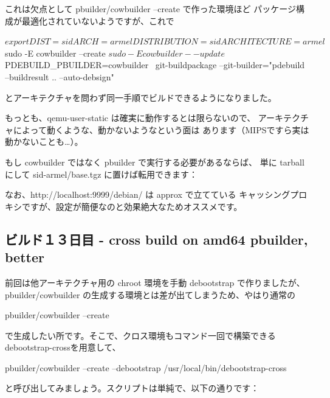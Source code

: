 \documentclass[mingoth,a4paper]{jsarticle}
\begin{document}
これは欠点として pbuilder/cowbuilder --create で作った環境ほど
パッケージ構成が最適化されていないようですが、これで

\begin{commandline}
$ export DIST=sid ARCH=armel DISTRIBUTION=sid ARCHITECTURE=armel
$ sudo -E cowbuilder --create
$ sudo -E cowbuilder --update
$ PDEBUILD_PBUILDER=cowbuilder \
git-buildpackage --git-builder="pdebuild --buildresult .. --auto-debsign"
\end{commandline}

とアーキテクチャを問わず同一手順でビルドできるようになりました。

もっとも、qemu-user-static は確実に動作するとは限らないので、
アーキテクチャによって動くような、動かないようなという面は
あります（MIPSですら実は動かないことも…）。

もし cowbuilder ではなく pbuilder で実行する必要があるならば、
単に tarball にして sid-armel/base.tgz に置けば転用できます：


なお、http://localhost:9999/debian/ は approx で立てている
キャッシングプロキシですが、設定が簡便なのと効果絶大なためオススメです。

\subsection{ビルド１３日目 - cross build on amd64 pbuilder, better}

前回は他アーキテクチャ用の chroot 環境を手動 debootstrap で作りましたが、
pbuilder/cowbuilder の生成する環境とは差が出てしまうため、やはり通常の

\begin{commandline}
pbuilder/cowbuilder --create
\end{commandline}

で生成したい所です。そこで、クロス環境もコマンド一回で構築できる
debootstrap-crossを用意して、

\begin{commandline}
pbuilder/cowbuilder --create --debootstrap /usr/local/bin/debootstrap-cross
\end{commandline}

と呼び出してみましょう。スクリプトは単純で、以下の通りです：
\end{document}
